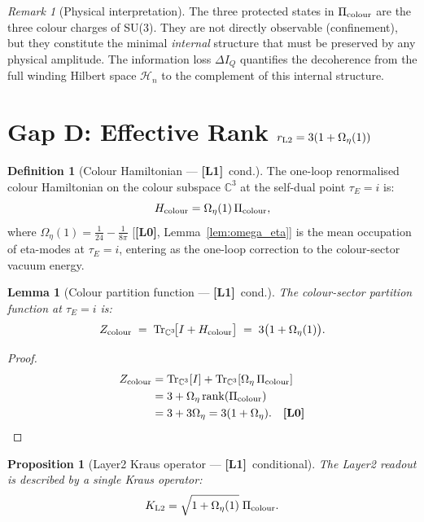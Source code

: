 \documentclass[12pt,a4paper]{article}
\newtheorem{lemma}[theorem]{Lemma}
\newtheorem{proposition}[theorem]{Proposition}
\theoremstyle{definition}\newtheorem{definition}[theorem]{Definition}
\theoremstyle{remark}\newtheorem{remark}[theorem]{Remark}
\newcommand{\Lz}{\textbf{[L0]}}
\newcommand{\Lo}{\textbf{[L1]}}
\newcommand{\CC}{\mathbb{C}}
\begin{document}
\begin{remark}[Physical interpretation]
The three protected states in $\Pi_{\rm colour}$ are the three
colour charges of SU(3). They are not directly observable
(confinement), but they constitute the minimal \emph{internal}
structure that must be preserved by any physical amplitude.
The information loss $\Delta I_Q$ quantifies the decoherence
from the full winding Hilbert space $\mathcal{H}_n$ to the
complement of this internal structure.
\end{remark}

\section{Gap D: Effective Rank $r_{\rm L2} = 3(1+\Omega_\eta(1))$}
\label{sec:gap_D}

\begin{definition}[Colour Hamiltonian — \Lo\ cond.]
\label{def:H_colour}
The one-loop renormalised colour Hamiltonian on the colour subspace
$\CC^3$ at the self-dual point $\tau_E = i$ is:
\[
  H_{\rm colour} = \Omega_\eta(1)\,\Pi_{\rm colour},
\]
where $\Omega_\eta(1) = \tfrac{1}{24} - \tfrac{1}{8\pi}$ [\Lz,
Lemma~\ref{lem:omega_eta}] is the mean occupation of eta-modes
at $\tau_E = i$, entering as the one-loop correction to the
colour-sector vacuum energy.
\end{definition}

\begin{lemma}[Colour partition function — \Lo\ cond.]
\label{lem:Z_colour}
The colour-sector partition function at $\tau_E = i$ is:
\[
  Z_{\rm colour}
  \;=\; \mathrm{Tr}_{\CC^3}\!\bigl[I + H_{\rm colour}\bigr]
  \;=\; 3\bigl(1 + \Omega_\eta(1)\bigr).
\]
\end{lemma}

\begin{proof}
\begin{align*}
  Z_{\rm colour}
  &= \mathrm{Tr}_{\CC^3}[I] + \mathrm{Tr}_{\CC^3}[\Omega_\eta\,\Pi_{\rm colour}] \\
  &= 3 + \Omega_\eta\,\mathrm{rank}(\Pi_{\rm colour}) \\
  &= 3 + 3\Omega_\eta = 3(1+\Omega_\eta). \quad \Lz
\end{align*}
\end{proof}

\begin{proposition}[Layer2 Kraus operator — \Lo\ conditional]
\label{prop:kraus}
The Layer2 readout is described by a single Kraus operator:
\[
  K_{\rm L2}
  = \sqrt{1+\Omega_\eta(1)}\;\Pi_{\rm colour}.
\]
\end{proposition}
\end{document}
